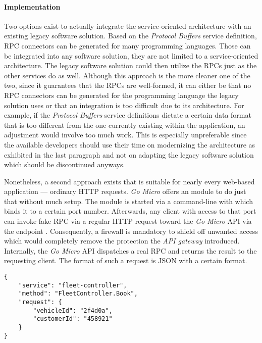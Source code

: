 \documentclass[12pt,a4paper,twoside]{report}
\begin{document}
\paragraph{Implementation}
Two options exist to actually integrate the service-oriented architecture
with an existing legacy software solution.
Based on the \textit{Protocol Buffers} service definition, RPC connectors can
be generated for many programming languages. Those can be integrated into any
software solution, they are not limited to a service-oriented architecture.
The legacy software solution could then utilize the RPCs just as the other
services do as well. Although this approach is the more cleaner one of the two,
since it guarantees that the RPCs are well-formed, it can either be
that no RPC connectors can be generated for the programming language the
legacy solution uses or that an integration is too difficult due to its
architecture. For example, if the \textit{Protocol Buffers} service definitions
dictate a certain data format that is too different from the one currently
existing within the application, an adjustment would involve too much work.
This is especially unpreferable since the available developers should use their
time on modernizing the architecture as exhibited in the last paragraph and
not on adapting the legacy software solution which should be discontinued anyways.

Nonetheless, a second approach exists that is suitable for nearly every
web-based application --- ordinary HTTP requests.
\textit{Go Micro} offers an  module to do just that without much
setup. The  module is started via a command-line with
 which binds it to a certain port number.
Afterwards, any client with access to that port can invoke fake RPC via a regular
HTTP request toward the \textit{Go Micro} API via the endpoint .
Consequently, a firewall is mandatory to shield off unwanted access which
would completely remove the protection the \textit{API gateway} introduced.
Internally, the \textit{Go Micro} API dispatches a real RPC and returns the
result to the requesting client. The format of such a request is JSON with
a certain format.

\begin{lstlisting}[title=\textit{Go Micro} API request, float, floatplacement=H]
{
	"service": "fleet-controller",
	"method": "FleetController.Book",
	"request": {
		"vehicleId": "2f4d0a",
		"customerId": "458921"
	}
}
\end{lstlisting}
\end{document}
